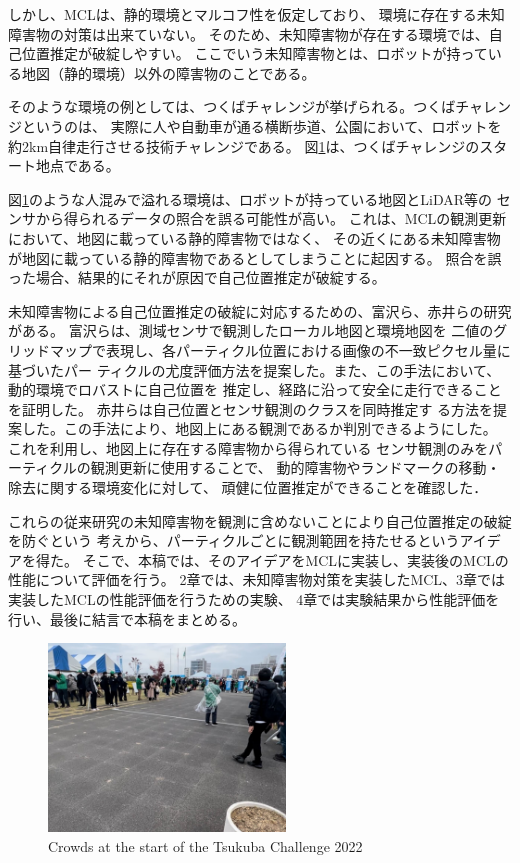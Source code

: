 \documentclass{jarticle}
\begin{document}
しかし、MCLは、静的環境とマルコフ性を仮定しており、
環境に存在する未知障害物の対策は出来ていない。
そのため、未知障害物が存在する環境では、自己位置推定が破綻しやすい。
ここでいう未知障害物とは、ロボットが持っている地図（静的環境）以外の障害物のことである。

そのような環境の例としては、つくばチャレンジ\cite{つくばチャレンジ}が挙げられる。つくばチャレンジというのは、
実際に人や自動車が通る横断歩道、公園において、ロボットを約2km自律走行させる技術チャレンジである。
図\ref{fig: つくばチャレンジ人混み}は、つくばチャレンジのスタート地点である。

図\ref{fig: つくばチャレンジ人混み}のような人混みで溢れる環境は、ロボットが持っている地図とLiDAR等の
センサから得られるデータの照合を誤る可能性が高い。
これは、MCLの観測更新において、地図に載っている静的障害物ではなく、
その近くにある未知障害物が地図に載っている静的障害物であるとしてしまうことに起因する。
照合を誤った場合、結果的にそれが原因で自己位置推定が破綻する。

未知障害物による自己位置推定の破綻に対応するための、富沢ら\cite{富沢}、赤井ら\cite{赤井}の研究がある。
富沢ら\cite{富沢}は、測域センサで観測したローカル地図と環境地図を
二値のグリッドマップで表現し、各パーティクル位置における画像の不一致ピクセル量に基づいたパー
ティクルの尤度評価方法を提案した。また、この手法において、動的環境でロバストに自己位置を
推定し、経路に沿って安全に走行できることを証明した。
赤井ら\cite{赤井}は自己位置とセンサ観測のクラスを同時推定す
る方法を提案した。この手法により、地図上にある観測であるか判別できるようにした。
これを利用し、地図上に存在する障害物から得られている
センサ観測のみをパーティクルの観測更新に使用することで、
動的障害物やランドマークの移動・除去に関する環境変化に対して、
頑健に位置推定ができることを確認した．

これらの従来研究の未知障害物を観測に含めないことにより自己位置推定の破綻を防ぐという
考えから、パーティクルごとに観測範囲を持たせるというアイデアを得た。
そこで、本稿では、そのアイデアをMCLに実装し、実装後のMCLの性能について評価を行う。
2章では、未知障害物対策を実装したMCL、3章では実装したMCLの性能評価を行うための実験、
4章では実験結果から性能評価を行い、最後に結言で本稿をまとめる。

\begin{figure}[h!]
  \centering
   \includegraphics[height=50mm]{fig/hitogomi.png}
   \vspace*{-4mm}
   \caption{Crowds at the start of the Tsukuba Challenge 2022}
   \label{fig: つくばチャレンジ人混み}
 \end{figure}
\end{document}
